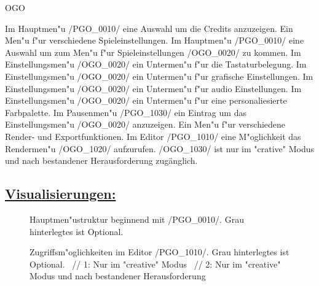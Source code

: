 \begin{ids}{\gls{OGO}}

	\id[0010] Im Hauptmen{"u} /PGO\_0010/ eine Auswahl um die Credits anzuzeigen.
	\id[0020] Ein Men{"u} f{"u}r verschiedene Spieleinstellungen.
	\id[0030] Im Hauptmen{"u} /PGO\_0010/ eine Auswahl um zum Men{"u} f{"u}r Spieleinstellungen /OGO\_0020/ zu kommen.
	\id[0040] Im Einstellungsmen{"u} /OGO\_0020/ ein Untermen{"u} f{"u}r die Tastaturbelegung.
	\id[0050] Im Einstellungsmen{"u} /OGO\_0020/ ein Untermen{"u} f{"u}r grafische Einstellungen.
	\id[0060] Im Einstellungsmen{"u} /OGO\_0020/ ein Untermen{"u} f{"u}r audio Einstellungen.
	\id[0070] Im Einstellungsmen{"u} /OGO\_0020/ ein Untermen{"u} f{"u}r eine personaliesierte Farbpalette.
	\id[1010] Im Pausenmen{"u} /PGO\_1030/ ein Eintrag um das Einstellungsmen{"u} /OGO\_0020/ anzuzeigen.
	\id[1020] Ein Men{"u} f{"u}r verschiedene Render- und Exportfunktionen.
	\id[1030] Im Editor /PGO\_1010/ eine M{"o}glichkeit das Rendermen{"u} /OGO\_1020/ aufzurufen.
	\id[1040] /OGO\_1030/ ist nur im "crative" Modus und nach bestandener Herausforderung zugänglich.
\end{ids}



%
%
%
\clearpage

\subsection*{\underline{Visualisierungen:}}

	\begin{figure}[h]
		\centering
	 	
	 	\caption{Hauptmen{"u}struktur beginnend mit /PGO\_0010/. Grau hinterlegtes ist Optional.}
	\end{figure}

\clearpage

	\begin{figure}[h]
		\centering
	 	
	 	\caption{Zugriffsm{"o}glichkeiten im Editor /PGO\_1010/. Grau hinterlegtes ist Optional. ~//
			1: Nur im "creative" Modus ~//
			2: Nur im "creative" Modus und nach bestandener Herausforderung}
	\end{figure}
	
\clearpage
	
